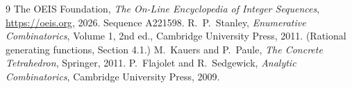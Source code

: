 \documentclass[11pt,a4paper]{article}
\theoremstyle{plain}
\theoremstyle{definition}
\begin{document}
\begin{thebibliography}{9}
 The OEIS Foundation, \emph{The On-Line Encyclopedia of Integer
Sequences}, \url{https://oeis.org}, 2026. Sequence A221598.
 R.~P.~Stanley, \emph{Enumerative Combinatorics}, Volume 1, 2nd ed.,
Cambridge University Press, 2011. (Rational generating functions, Section 4.1.)
 M.~Kauers and P.~Paule, \emph{The Concrete Tetrahedron}, Springer, 2011.
 P.~Flajolet and R.~Sedgewick, \emph{Analytic Combinatorics}, Cambridge
University Press, 2009.
\end{thebibliography}
\end{document}
